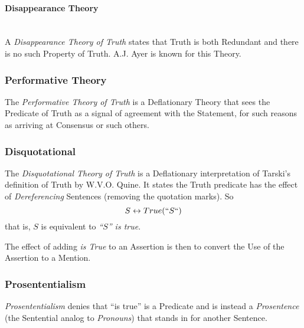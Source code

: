 \documentclass{article}
\begin{document}
\paragraph{Disappearance Theory}
\hfill \\ A \emph{Disappearance Theory of Truth} states that Truth is
both Redundant and there is no such Property of Truth. A.J. Ayer is
known for this Theory.

\subsubsection{Performative Theory}

The \emph{Performative Theory of Truth} is a Deflationary Theory that
sees the Predicate of Truth as a signal of agreement with the
Statement, for such reasons as arriving at Consensus or such others.

\subsubsection{Disquotational}

The \emph{Disquotational Theory of Truth} is a Deflationary
interpretation of Tarski's definition of Truth by W.V.O. Quine. It
states the Truth predicate has the effect of \emph{Dereferencing}
Sentences (removing the quotation marks). So
\[
    S \leftrightarrow True(``S``)
\]
that is, $S$ is equivalent to \emph{``$S$'' is true}.

The effect of adding \emph{is True} to an Assertion is then to convert
the Use of the Assertion to a Mention.

\subsubsection{Prosententialism}

\emph{Prosententialism} denies that ``is true'' is a Predicate and is
instead a \emph{Prosentence} (the Sentential analog to
\emph{Pronouns}) that stands in for another Sentence.
\end{document}
